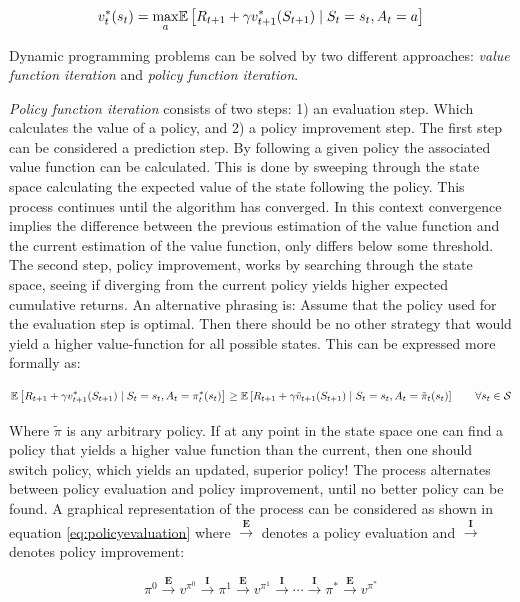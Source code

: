 \begin{equation}
    v_t^{*}(s_t) = \underset{a}{\max}  \mathbb{E} \left[ R_{t+1} + \gamma v^{*}_{t+1}(S_{t+1}) \mid S_t = s_t, A_t = a\right] 
\end{equation}

Dynamic programming problems can be solved by two different approaches: \textit{value function iteration} and \textit{policy function iteration}.

\textit{Policy function iteration} consists of two steps: 1) an evaluation step. Which calculates the value of a policy, and 2) a policy improvement step.
The first step can be considered a prediction step. By following a given policy the associated value function can be calculated. This is done by sweeping through the state space calculating the expected value of the state following the policy. This process continues until the algorithm has converged. In this context convergence implies the difference between the previous estimation of the value function and the current estimation of the value function, only differs below some threshold. The second step, policy improvement, works by searching through the state space, seeing if diverging from the current policy yields higher expected cumulative returns. An alternative phrasing is: Assume that the policy used for the evaluation step is optimal. Then there should be no other strategy that would yield a higher value-function for all possible states. This can be expressed more formally as:

\begin{equation}
     \mathbb{E} \left[ R_{t+1} + \gamma v^{*}_{t+1}(S_{t+1}) \mid S_t = s_t, A_t = \pi_t^*(s_t) \right] \geq \mathbb{E} \left[ R_{t+1} + \gamma \tilde{v}_{t+1}(S_{t+1}) \mid S_t = s_t, A_t =\tilde{\pi}_t(s_t) \right] \qquad \forall s_t \in \mathcal{S}
\end{equation}

Where $\tilde{\pi}$ is any arbitrary policy. If at any point in the state space one can find a policy that yields a higher value function than the current, then one should switch policy, which yields an updated, superior policy! The process alternates between policy evaluation and policy improvement, until no better policy can be found. A graphical representation of the process can be considered as shown in equation \eqref{eq:policyevaluation} where $\overset{\textbf{E}}{\longrightarrow}$ denotes a policy evaluation and $\overset{\textbf{I}}{\longrightarrow}$ denotes policy improvement:

\begin{equation}
    \label{eq:policyevaluation}
    \pi^0 \overset{\textbf{E}}{\longrightarrow}
    v^{\pi^0} \overset{\textbf{I}}{\longrightarrow} \pi^1 \overset{\textbf{E}}{\longrightarrow} v^{\pi^1} \overset{\textbf{I}}{\longrightarrow} \cdots \overset{\textbf{I}}{\longrightarrow} \pi^* \overset{\textbf{E}}{\longrightarrow} v^{\pi^*}
\end{equation}

